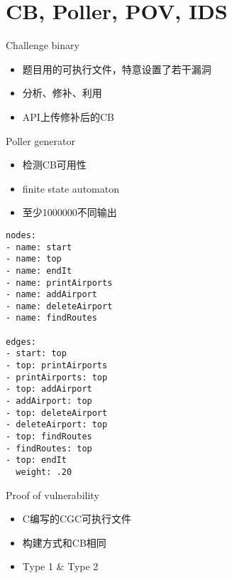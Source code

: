 \documentclass{beamer}
\begin{document}
\section{CB, Poller, POV, IDS}

\begin{frame}
  \begin{block}{Challenge binary}
    \begin{itemize}
      \item 题目用的可执行文件，特意设置了若干漏洞
      \item 分析、修补、利用
      \item API上传修补后的CB
    \end{itemize}
  \end{block}
\end{frame}

\begin{frame}
  \begin{block}{Poller generator}
    \begin{itemize}
      \item 检测CB可用性
      \item finite state automaton
      \item 至少1000000不同输出
    \end{itemize}
  \end{block}
\end{frame}

\begin{frame}[fragile]{}
  \tiny
  \begin{center}
    \begin{minipage}{0.5\textwidth}
      \begin{verbatim}
nodes:
- name: start
- name: top
- name: endIt
- name: printAirports
- name: addAirport
- name: deleteAirport
- name: findRoutes

edges:
- start: top
- top: printAirports
- printAirports: top
- top: addAirport
- addAirport: top
- top: deleteAirport
- deleteAirport: top
- top: findRoutes
- findRoutes: top
- top: endIt
  weight: .20
      \end{verbatim}
    \end{minipage}
  \end{center}
\end{frame}

\begin{frame}
  \begin{block}{Proof of vulnerability}
    \begin{itemize}
      \item C编写的CGC可执行文件
      \item 构建方式和CB相同
      \item Type 1 \& Type 2
    \end{itemize}
  \end{block}
\end{frame}
\end{document}
